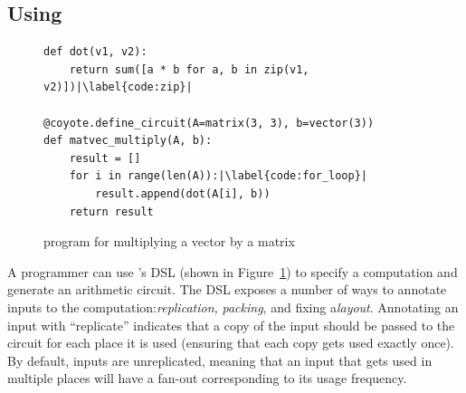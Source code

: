 
\subsection{Using \system}\label{sec:using-coyote}
\begin{figure}
    \small
    \begin{verbatim}
def dot(v1, v2):
    return sum([a * b for a, b in zip(v1, v2)])|\label{code:zip}|
  
@coyote.define_circuit(A=matrix(3, 3), b=vector(3))
def matvec_multiply(A, b):
    result = []
    for i in range(len(A)):|\label{code:for_loop}|
        result.append(dot(A[i], b))
    return result
    \end{verbatim}
    \vspace{-1em}
    \caption{\system program for multiplying a vector by a matrix}\label{fig:coyote-program}
\end{figure}
A programmer can use {\system}'s DSL (shown in Figure~{\ref{fig:coyote-program}}) to specify a computation and generate an arithmetic circuit. %
The DSL exposes a number of ways to annotate inputs to the computation:{\em  replication, }{\em packing}, and fixing a{\em layout}.
Annotating an input with ``replicate'' indicates that a copy of the input should be passed to the circuit for each place it is used (ensuring that each copy gets used exactly once).
By default, inputs are unreplicated, meaning that an input that gets used in multiple places will have a fan-out corresponding to its usage frequency.

